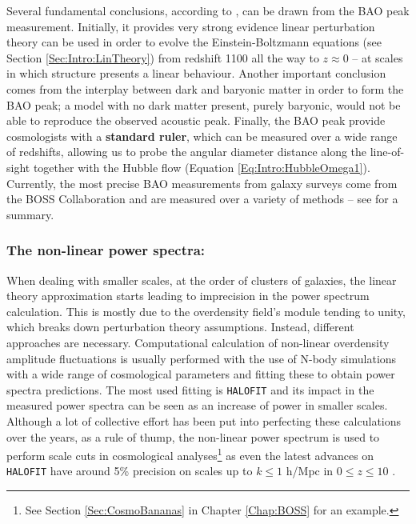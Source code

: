 \qquad Several fundamental conclusions, according to \cite{Einsenstein2005}, can be drawn from the BAO peak measurement. Initially, it provides very strong evidence linear perturbation theory can be used in order to evolve the Einstein-Boltzmann equations (see Section \ref{Sec:Intro:LinTheory}) from redshift 1100 all the way to $z \approx 0$ -- at scales in which structure presents a linear behaviour. Another important conclusion comes from the interplay between dark and baryonic matter in order to form the BAO peak; a model with no dark matter present, purely baryonic, would not be able to reproduce the observed acoustic peak. Finally, the BAO peak provide cosmologists with a \textbf{standard ruler}, which can be measured over a wide range of redshifts, allowing us to probe the angular diameter distance along the line-of-sight together with the Hubble flow (Equation \ref{Eq:Intro:HubbleOmega1}). Currently, the most precise BAO measurements from galaxy surveys come from the BOSS Collaboration and are measured over a variety of methods -- see \citealt{2016BOSSCosmology} for a summary.

\subsubsection{The non-linear power spectra:}
When dealing with smaller scales, at the order of clusters of galaxies, the linear theory approximation starts leading to imprecision in the power spectrum calculation. This is mostly due to the overdensity field's module tending to unity, which breaks down perturbation theory assumptions. Instead, different approaches are necessary. Computational calculation of non-linear overdensity amplitude fluctuations is usually performed with the use of N-body simulations with a wide range of cosmological parameters and fitting these to obtain power spectra predictions. The most used fitting is \texttt{HALOFIT} \citep{2003HaloFit} and its impact in the measured power spectra can be seen as an increase of power in smaller scales. Although a lot of collective effort has been put into perfecting these calculations over the years, as a rule of thump, the non-linear power spectrum is used to perform scale cuts in cosmological analyses\footnote{See Section \ref{Sec:CosmoBananas} in Chapter \ref{Chap:BOSS} for an example.} as even the latest advances on \texttt{HALOFIT} have around 5\% precision on scales up to $k\leq 1$ h/Mpc in $0\leq z \leq 10$ \citep{Takahashi2012,Bird2012}. 

